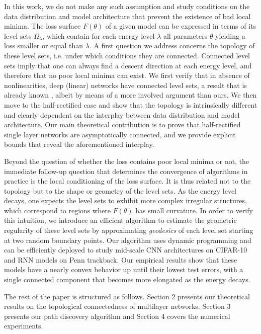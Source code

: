 In this work, we do not make any such assumption and study conditions 
on the data distribution and model architecture that prevent the existence 
of bad local minima. 
The loss surface $F(\theta)$ of a given model can be expressed in terms of its level sets $\Omega_\lambda$, which contain for each energy level $\lambda$ all parameters $\theta$ yielding a loss smaller or equal than $\lambda$. A first question we address concerns the topology of these level sets, i.e. under which conditions they are connected. Connected level sets imply that one can always find a descent direction at each energy level, and therefore that no poor local minima can exist. We first verify that in absence of nonlinearities, deep (linear) networks have connected level sets, a result that is already known \cite{followupmit}, albeit by means of a more involved argument than ours. We then move to the half-rectified case and show that the topology is intrinsically different and clearly dependent on the interplay between data distribution and model architecture. Our main theoretical contribution is to prove that half-rectified single layer networks are asymptotically connected, and we provide explicit bounds that reveal the aforementioned interplay.

Beyond the question of whether the loss contains poor local minima or not, the immediate follow-up question that determines the convergence of algorithms in practice is the local conditioning of the loss surface. It is thus related not to the topology but to the shape or geometry of the level sets. As the energy level decays, one expects the level sets to exhibit more complex irregular structures, which correspond to regions where $F(\theta)$ has small curvature. In order to verify this intuition, we introduce an efficient algorithm to estimate the geometric regularity of these level sets by approximating \emph{geodesics} of each level set starting at two random boundary points. Our algorithm uses dynamic programming and can be efficiently deployed to study mid-scale CNN architectures on CIFAR-10 and RNN models on Penn trackback. 
Our empirical results show that these models have a nearly convex behavior up until their lowest test errors, with a single connected component that becomes more elongated as the energy decays. 

The rest of the paper is structured as follows. Section 2 presents our theoretical results on the topological connectedness of multilayer networks. Section 3 presents our path discovery algorithm and Section 4 covers the numerical experiments. 













